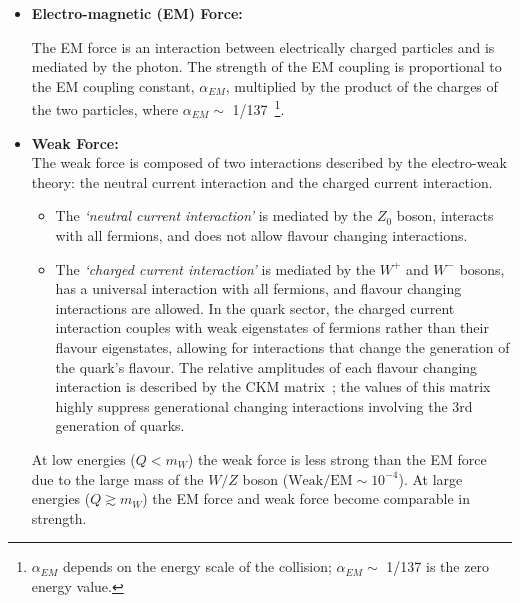 \begin{itemize}[leftmargin=*]
\item\textbf{Electro-magnetic (EM) Force:}

  The EM force is an interaction between electrically charged particles and is mediated by the photon.
  The strength of the EM coupling is proportional to the EM coupling constant, $\alpha_{EM}$,
  multiplied by the product of the charges of the two particles, where $\alpha_{EM} \sim$ 1/137~\footnote{ $\alpha_{EM}$
    depends on the energy scale of the collision;  $\alpha_{EM} \sim$ 1/137 is the zero energy value.}.\vspace{1em}

\item\textbf{Weak Force:} \\
  The weak force is composed of two interactions described by the electro-weak theory:
  the neutral current interaction and the charged current interaction.
  \begin{itemize}[leftmargin=*]  
  \item The \textit{`neutral current interaction'} is mediated by the $Z_0$ boson, interacts with all fermions,
    and does not allow flavour changing interactions.
  \item The \textit{`charged current interaction'} is mediated by the $W^+$ and $W^-$ bosons,
    has a universal interaction with all fermions,
    and flavour changing interactions are allowed.
    In the quark sector, the charged current interaction
    couples with weak eigenstates of fermions rather than their flavour eigenstates,
    allowing for interactions that change the generation of the quark's flavour.
    The relative amplitudes of each flavour changing interaction is described by the CKM matrix~\cite{theo-ckm};
    the values of this matrix highly suppress generational changing interactions involving the 3rd generation of quarks.
  \end{itemize}
  At low energies ($Q < m_W$) the weak force is less strong than the EM force due to the large mass of the $W/Z$ boson
  \mbox{($\text{Weak}/\text{EM} \sim 10^{-4}$)}. At large energies ($Q \gtrsim m_W$)
  the EM force and weak force become comparable in strength.\vspace{1em} %
  

\end{itemize}
